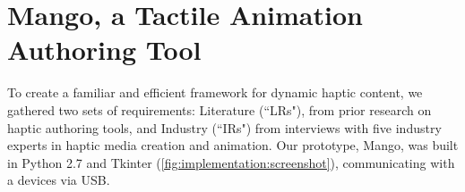 %	
%



%
%
\section{Mango, a Tactile Animation Authoring Tool}
To create a familiar and efficient %
framework for  dynamic haptic content, we gathered two sets of requirements: Literature  (``LRs"), from prior research on haptic authoring tools, and Industry (``IRs") from interviews with five industry experts in haptic media creation and animation.
Our prototype, Mango, was built in  Python 2.7 and Tkinter (\autoref{fig:implementation:screenshot}),
communicating with a devices via USB.




%
%

%


